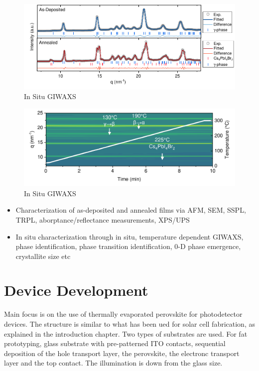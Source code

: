 \begin{figure}
  \centering
  \medskip
  \includegraphics[width=\textwidth]{chapters/material_properties/images/GIWAXS_Before_After.pdf}
  \caption[Short caption for Table of Figures]{In Situ GIWAXS}
  \label{fig:ch2:giwaxs_before_after}
\end{figure}


\begin{figure}
  \centering
  \medskip
  \includegraphics[width=\textwidth]{chapters/material_properties/images/GIWAXS_In_Situ.pdf}
  \caption[Short caption for Table of Figures]{In Situ GIWAXS}
  \label{fig:ch2:giwaxs_insitu}
\end{figure}

\begin{itemize}
    \item Characterization of as-deposited and annealed films via AFM, SEM, SSPL, TRPL, aborptance/reflectance measurements, XPS/UPS
    \item In situ characterization through in situ, temperature dependent GIWAXS, phase identification, phase transition identification, 0-D phase emergence, crystallite size etc
\end{itemize}

\section{Device Development}

Main focus is on the use of thermally evaporated perovskite for photodetector devices. The structure is similar to what has been ued for solar cell fabrication, as explained in the introduction chapter. Two types of substrates are used. For fat prototyping, glass substrate with pre-patterned ITO contacts, sequential deposition of the hole transport layer, the perovskite, the electronc transport layer and the top contact. The illumination is down from the glass size. 

